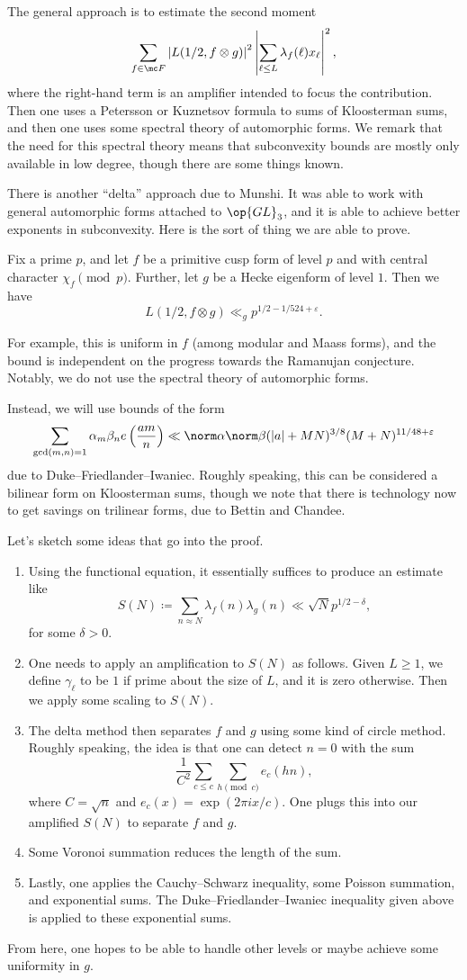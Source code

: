 \documentclass{article}
\begin{document}
The general approach is to estimate the second moment
\[\sum_{f\in\mc F}\left|L(1/2,f\otimes g)\right|^2\left|\sum_{\ell\le L}\lambda_f(\ell)x_\ell\right|^2,\]
where the right-hand term is an amplifier intended to focus the contribution. Then one uses a Petersson or Kuznetsov formula to sums of Kloosterman sums, and then one uses some spectral theory of automorphic forms. We remark that the need for this spectral theory means that subconvexity bounds are mostly only available in low degree, though there are some things known.

There is another ``delta'' approach due to Munshi. It was able to work with general automorphic forms attached to $\op{GL}_3$, and it is able to achieve better exponents in subconvexity. Here is the sort of thing we are able to prove.
\begin{theorem}
	Fix a prime $p$, and let $f$ be a primitive cusp form of level $p$ and with central character $\chi_f\pmod p$. Further, let $g$ be a Hecke eigenform of level $1$. Then we have
	\[L(1/2,f\otimes g)\ll_g p^{1/2-1/524+\varepsilon}.\]
\end{theorem}
For example, this is uniform in $f$ (among modular and Maass forms), and the bound is independent on the progress towards the Ramanujan conjecture. Notably, we do not use the spectral theory of automorphic forms.

Instead, we will use bounds of the form
\[\sum_{\gcd(m,n)=1}\alpha_m\beta_ne\left(\frac{am}n\right)\ll\norm\alpha\norm\beta(\left|a\right|+MN)^{3/8}(M+N)^{11/48+\varepsilon}\]
due to Duke--Friedlander--Iwaniec. Roughly speaking, this can be considered a bilinear form on Kloosterman sums, though we note that there is technology now to get savings on trilinear forms, due to Bettin and Chandee.

Let's sketch some ideas that go into the proof.
\begin{enumerate}
	\item Using the functional equation, it essentially suffices to produce an estimate like
	\[S(N)\coloneqq\sum_{n\approx N}\lambda_f(n)\lambda_g(n)\ll\sqrt N p^{1/2-\delta},\]
	for some $\delta>0$.
	\item One needs to apply an amplification to $S(N)$ as follows. Given $L\ge1$, we define $\gamma_\ell$ to be $1$ if prime about the size of $L$, and it is zero otherwise. Then we apply some scaling to $S(N)$.
	\item The delta method then separates $f$ and $g$ using some kind of circle method. Roughly speaking, the idea is that one can detect $n=0$ with the sum
	\[\frac1{C^2}\sum_{c\le c}\sum_{h\pmod c}e_c(hn),\]
	where $C=\sqrt n$ and $e_c(x)=\exp(2\pi ix/c)$. One plugs this into our amplified $S(N)$ to separate $f$ and $g$.
	\item Some Voronoi summation reduces the length of the sum.
	\item Lastly, one applies the Cauchy--Schwarz inequality, some Poisson summation, and exponential sums. The Duke--Friedlander--Iwaniec inequality given above is applied to these exponential sums.
\end{enumerate}
From here, one hopes to be able to handle other levels or maybe achieve some uniformity in $g$.
\end{document}
